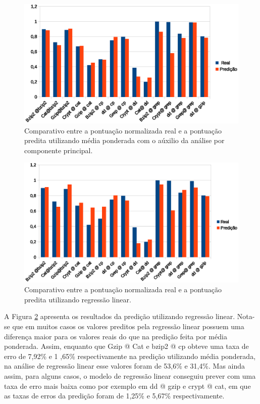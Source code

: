 \begin{figure}[!htb]
\centering
\includegraphics [keepaspectratio=true,scale=0.8]{graficos/mean_predict.eps}
\caption{Comparativo entre a pontuação normalizada real e a pontuação predita utilizando média ponderada com o aúxilio da análise por componente principal.}
\label{mean_predict}
\end{figure}   



\begin{figure}[!htb]
\centering
\includegraphics [keepaspectratio=true,scale=0.8]{graficos/linear.eps}
\caption{Comparativo entre a pontuação normalizada real e a pontuação predita utilizando regressão linear.}
\label{linear_predict}
\end{figure}   

A Figura \ref{linear_predict} apresenta os resultados da predição utilizando regressão linear. Nota-se que em muitos casos os valores preditos pela regressão linear possuem uma diferença maior para os valores reais do que na predição feita por média ponderada. Assim, enquanto que Gzip @ Cat e bzip2 @ cp obteve uma taxa de erro de 7,92\% e 1 ,65\% respectivamente na predição utilizando média ponderada, na análise de regressão linear esse valores foram de 53,6\% e 31,4\%. Mas ainda assim, para alguns casos, o modelo de regressão linear conseguiu prever com uma taxa de erro mais baixa como por exemplo em dd @ gzip e crypt @ cat, em que as taxas de erros da predição foram de 1,25\% e 5,67\% respectivamente.

